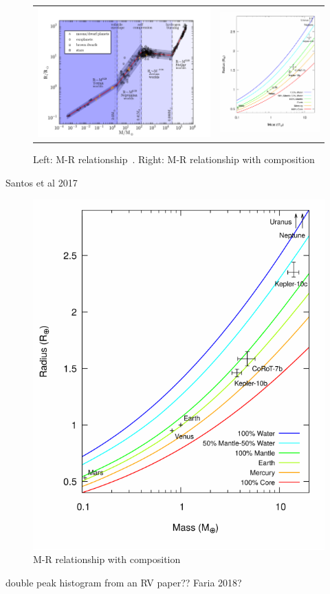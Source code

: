\begin{figure}
    \centering
    \begin{tabular}{cc}
        \includegraphics[width=0.5\linewidth]{./figures/introduction/mass_radius_relation.pdf}  &  \includegraphics[width=0.4\linewidth]{./figures/introduction/Mass_radius_relation-compostion_Brugger_2017.pdf}\\
    \end{tabular}
    \caption{Left: M-R relationship~\citet{chen_probabilistic_2016}. Right: M-R relationship with composition~\citet{brugger_constraints_2017}}
    \label{fig:mass_radius_relation}
\end{figure}

Santos et al 2017 

\begin{figure}
    \centering
    \includegraphics[width=0.4\linewidth]{./figures/introduction/Mass_radius_relation-compostion_Brugger_2017.pdf}
    \caption{M-R relationship with composition~\citet{brugger_constraints_2017}}
\label{fig:mass_radius_relation}
\end{figure}
double peak histogram from an {RV} paper?? Faria 2018?


